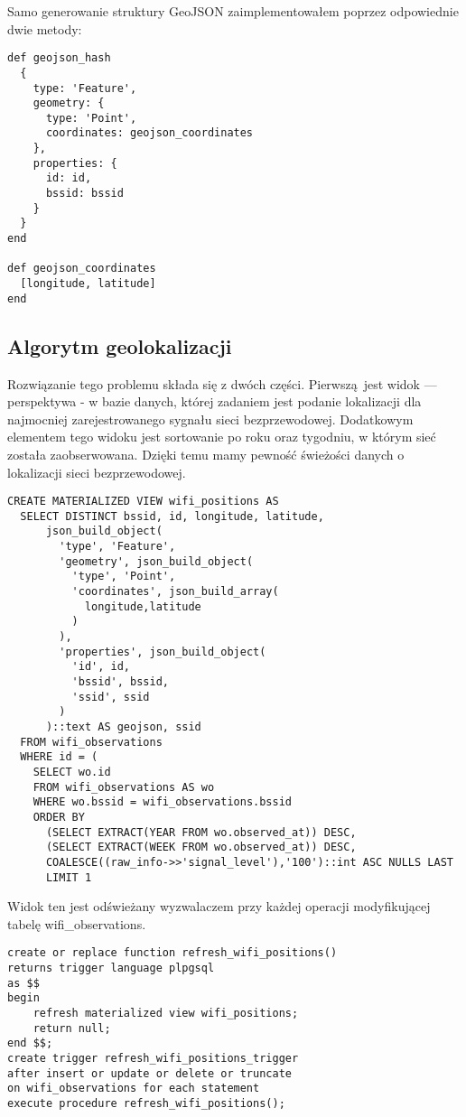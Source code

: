 Samo generowanie struktury GeoJSON zaimplementowałem poprzez odpowiednie dwie metody:

\begin{verbatim}
def geojson_hash
  {
    type: 'Feature',
    geometry: {
      type: 'Point',
      coordinates: geojson_coordinates
    },
    properties: {
      id: id,
      bssid: bssid
    }
  }
end

def geojson_coordinates
  [longitude, latitude]
end
\end{verbatim}

\subsection{Algorytm geolokalizacji}

Rozwiązanie tego problemu składa się z dwóch części. Pierwszą jest widok — perspektywa - w bazie danych, której zadaniem jest podanie lokalizacji dla najmocniej zarejestrowanego sygnału sieci bezprzewodowej. Dodatkowym elementem tego widoku jest sortowanie po roku oraz tygodniu, w którym sieć została zaobserwowana. Dzięki temu mamy pewność świeżości danych o lokalizacji sieci bezprzewodowej.

\begin{verbatim}
CREATE MATERIALIZED VIEW wifi_positions AS
  SELECT DISTINCT bssid, id, longitude, latitude,
      json_build_object(
        'type', 'Feature',
        'geometry', json_build_object(
          'type', 'Point',
          'coordinates', json_build_array(
            longitude,latitude
          )
        ),
        'properties', json_build_object(
          'id', id,
          'bssid', bssid,
          'ssid', ssid
        )
      )::text AS geojson, ssid
  FROM wifi_observations
  WHERE id = (
    SELECT wo.id
    FROM wifi_observations AS wo
    WHERE wo.bssid = wifi_observations.bssid
    ORDER BY
      (SELECT EXTRACT(YEAR FROM wo.observed_at)) DESC,
      (SELECT EXTRACT(WEEK FROM wo.observed_at)) DESC,
      COALESCE((raw_info->>'signal_level'),'100')::int ASC NULLS LAST
      LIMIT 1
\end{verbatim}

Widok ten jest odświeżany wyzwalaczem przy każdej operacji modyfikującej tabelę wifi_observations.

\begin{verbatim}
create or replace function refresh_wifi_positions()
returns trigger language plpgsql
as $$
begin
    refresh materialized view wifi_positions;
    return null;
end $$;
create trigger refresh_wifi_positions_trigger
after insert or update or delete or truncate
on wifi_observations for each statement
execute procedure refresh_wifi_positions();
\end{verbatim}

